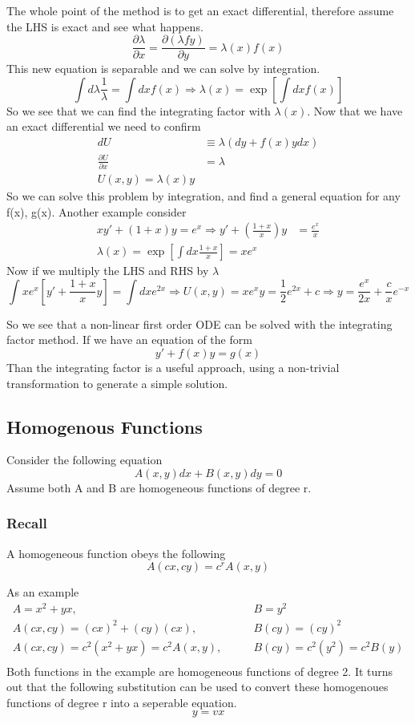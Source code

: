 \documentclass{article}
\newcommand{\be}{\begin{equation}}
\newcommand{\ee}{\end{equation}}
\newcommand{\pd}{\partial}
\begin{document}
The whole point of the method is to get an exact differential, therefore assume the LHS is exact and see what happens. 
\be
\frac{\pd\lambda}{\pd x} = \frac{\pd (\lambda f y)}{\pd y} = \lambda(x) f(x)
\ee
This new equation is separable and we can solve by integration.
\be
\int d\lambda \frac{1}{\lambda} = \int dx f(x) \Rightarrow \lambda(x) = \exp\left[\int dx f(x)\right]
\ee
So we see that we can find the integrating factor with $\lambda(x)$.
Now that we have an exact differential we need to confirm
\be
\begin{split}
    dU &\equiv \lambda(dy + f(x)ydx)\\
    \frac{\pd U}{\pd x} &= \lambda\\
    U(x,y) = \lambda(x) y
\end{split}
\ee
So we can solve this problem by integration, and find a general equation for any f(x), g(x). Another example consider
\be
\begin{split}
    xy' + (1+x) y = e^x \Rightarrow y' + \left(\frac{1+x}{x}\right)y &= \frac{e^x}{x}\\
    \lambda(x) = \exp\left[ \int dx \frac{1+x}{x} \right] = xe^x
\end{split}
\ee
Now if we multiply the LHS and RHS by $\lambda$
\be
\int xe^x\left[y' + \frac{1+x}{x} y\right] = \int dx e^{2x} \Rightarrow U(x,y) = xe^xy = \frac{1}{2} e^{2x} + c \Rightarrow y = \frac{e^x}{2x} + \frac{c}{x} e^{-x}
\ee

So we see that a non-linear first order ODE can be solved with the integrating factor method.
If we have an equation of the form
\be
y' + f(x)y = g(x)
\ee
Than the integrating factor is a useful approach, using a non-trivial transformation to generate a simple solution.

\subsection*{Homogenous Functions}
Consider the following equation
\be
A(x,y)dx + B(x,y)dy = 0
\ee
Assume both A and B are homogeneous functions of degree r.

\subsubsection*{Recall}
A homogeneous function obeys the following
\be
A(cx,cy) = c^r A(x,y)
\ee

As an example
\be
\begin{split}
    A = x^2 + yx, &\qquad B = y^2\\
    A(cx,cy) = (cx)^2 + (cy)(cx), &\qquad B(cy) = (cy)^2\\
    A(cx,cy) = c^2\left(x^2 + yx\right) = c^2A(x,y), &\qquad B(cy) = c^2\left(y^2\right) = c^2 B(y)\\
\end{split}
\ee
Both functions in the example are homogeneous functions of degree 2. 
It turns out that the following substitution can be used to convert these homogenoues functions of degree r into a seperable equation.
\be
y = vx
\ee
\end{document}
